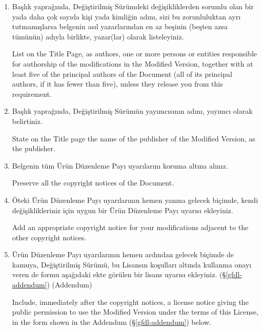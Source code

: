 \begin{multicols}{2}
\begin{enumerate}
\item Başlık yaprağında, Değiştirilmiş Sürümdeki değişikliklerden sorumlu olan bir yada daha çok sayıda kişi yada kimliğin adını, sizi bu zorunluluktan ayrı tutmamışlarsa belgenin asıl yazarlarından en az beşinin (beşten azsa tümünün) adıyla birlikte, yazar(lar) olarak listeleyiniz. 
\begin{ingliz}
List on the Title Page, as authors, one or
more persons or entities responsible for authorship of the
modifications in the Modified Version, together with at
least five of the principal authors of the Document (all
of its principal authors, if it has fewer than five),
unless they release you from this requirement.
\end{ingliz}

\item Başlık yaprağında, Değiştirilmiş Sürümün yayımcısının adını, yayımcı olarak belirtiniz.
\begin{ingliz}
State on the Title page the name of the
publisher of the Modified Version, as the
publisher.
\end{ingliz}

\item Belgenin tüm Ürün Düzenleme Payı uyarılarını koruma altına alınız.
\begin{ingliz}Preserve all the copyright notices of the Document.\end{ingliz}          

\item Öteki Ürün Düzenleme Payı uyarılarının hemen yanına gelecek biçimde, kendi değişiklikleriniz için uygun bir Ürün Düzenleme Payı uyarısı ekleyiniz. 
\begin{ingliz}Add an appropriate copyright notice for
your modifications adjacent to the other copyright notices.\end{ingliz}          

\item Ürün Düzenleme Payı uyarılarının hemen ardından gelecek biçimde de kamuya, Değiştirilmiş Sürümü, bu Lisansın koşulları altında kullanma onayı veren de formu aşağıdaki ekte görülen bir lisans uyarısı ekleyiniz. (\S\thinspace\ref{gfdl-addendum}) (Addendum)
\begin{ingliz}Include, immediately after the copyright
notices, a license notice giving the public permission to
use the Modified Version under the terms of this License,
in the form shown in the Addendum (\S\thinspace\ref{gfdl-addendum}) below.\end{ingliz}


\end{enumerate}
\end{multicols}
